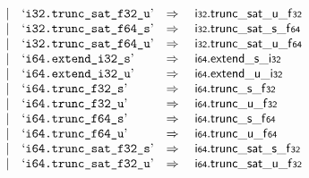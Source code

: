 $$\begin{array}[t]{@{}lrrl@{}l@{}l@{}l@{}}
& & | & \mbox{‘\texttt{i32.trunc\_sat\_f32\_u}’} & \quad\Rightarrow\quad{} & \mathsf{i{\scriptstyle 32}} {.} {{\mathsf{trunc\_sat}}{\mathsf{\_}}{\mathsf{u}}}{\mathsf{\_}}{\mathsf{f{\scriptstyle 32}}} \\
& & | & \mbox{‘\texttt{i32.trunc\_sat\_f64\_s}’} & \quad\Rightarrow\quad{} & \mathsf{i{\scriptstyle 32}} {.} {{\mathsf{trunc\_sat}}{\mathsf{\_}}{\mathsf{s}}}{\mathsf{\_}}{\mathsf{f{\scriptstyle 64}}} \\
& & | & \mbox{‘\texttt{i32.trunc\_sat\_f64\_u}’} & \quad\Rightarrow\quad{} & \mathsf{i{\scriptstyle 32}} {.} {{\mathsf{trunc\_sat}}{\mathsf{\_}}{\mathsf{u}}}{\mathsf{\_}}{\mathsf{f{\scriptstyle 64}}} \\
& & | & \mbox{‘\texttt{i64.extend\_i32\_s}’} & \quad\Rightarrow\quad{} & \mathsf{i{\scriptstyle 64}} {.} {{\mathsf{extend}}{\mathsf{\_}}{\mathsf{s}}}{\mathsf{\_}}{\mathsf{i{\scriptstyle 32}}} \\
& & | & \mbox{‘\texttt{i64.extend\_i32\_u}’} & \quad\Rightarrow\quad{} & \mathsf{i{\scriptstyle 64}} {.} {{\mathsf{extend}}{\mathsf{\_}}{\mathsf{u}}}{\mathsf{\_}}{\mathsf{i{\scriptstyle 32}}} \\
& & | & \mbox{‘\texttt{i64.trunc\_f32\_s}’} & \quad\Rightarrow\quad{} & \mathsf{i{\scriptstyle 64}} {.} {{\mathsf{trunc}}{\mathsf{\_}}{\mathsf{s}}}{\mathsf{\_}}{\mathsf{f{\scriptstyle 32}}} \\
& & | & \mbox{‘\texttt{i64.trunc\_f32\_u}’} & \quad\Rightarrow\quad{} & \mathsf{i{\scriptstyle 64}} {.} {{\mathsf{trunc}}{\mathsf{\_}}{\mathsf{u}}}{\mathsf{\_}}{\mathsf{f{\scriptstyle 32}}} \\
& & | & \mbox{‘\texttt{i64.trunc\_f64\_s}’} & \quad\Rightarrow\quad{} & \mathsf{i{\scriptstyle 64}} {.} {{\mathsf{trunc}}{\mathsf{\_}}{\mathsf{s}}}{\mathsf{\_}}{\mathsf{f{\scriptstyle 64}}} \\
& & | & \mbox{‘\texttt{i64.trunc\_f64\_u}’} & \quad\Rightarrow\quad{} & \mathsf{i{\scriptstyle 64}} {.} {{\mathsf{trunc}}{\mathsf{\_}}{\mathsf{u}}}{\mathsf{\_}}{\mathsf{f{\scriptstyle 64}}} \\
& & | & \mbox{‘\texttt{i64.trunc\_sat\_f32\_s}’} & \quad\Rightarrow\quad{} & \mathsf{i{\scriptstyle 64}} {.} {{\mathsf{trunc\_sat}}{\mathsf{\_}}{\mathsf{s}}}{\mathsf{\_}}{\mathsf{f{\scriptstyle 32}}} \\
& & | & \mbox{‘\texttt{i64.trunc\_sat\_f32\_u}’} & \quad\Rightarrow\quad{} & \mathsf{i{\scriptstyle 64}} {.} {{\mathsf{trunc\_sat}}{\mathsf{\_}}{\mathsf{u}}}{\mathsf{\_}}{\mathsf{f{\scriptstyle 32}}} \\

\end{array}$$
